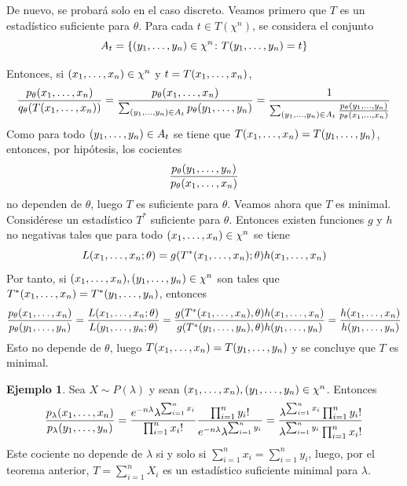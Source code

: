 \documentclass[11pt]{report}
\makeatletter
\renewenvironment{proof}[1][\proofname]{\par
  \pushQED{\qed}%
  \normalfont \topsep\z@skip %
  \trivlist
  \item[\hskip\labelsep
        \itshape
    #1\@addpunct{.}]\ignorespaces
}{%
  \popQED\endtrivlist\@endpefalse
}
\theoremstyle{definition}
\newtheorem{example}{Ejemplo}
\makeatother
\begin{document}
\begin{proof}
De nuevo, se probará solo en el caso discreto. Veamos primero que $T$ es un estadístico suficiente para $\theta$. Para cada $t \in T(\chi^n)$, se considera el conjunto \[A_t = \left\{(y_1,\mathellipsis,y_n) \in \chi^n \colon T(y_1,\mathellipsis,y_n) =t\right\}\] 

Entonces, si $(x_1,\mathellipsis,x_n) \in \chi^n$ y $t = T(x_1,\mathellipsis,x_n)$,
\[\frac{p_\theta(x_1,\mathellipsis,x_n)}{q_\theta(T(x_1,\mathellipsis,x_n))}= \frac{p_\theta(x_1,\mathellipsis,x_n)}{ \sum_{(y_1,\mathellipsis,y_n) \in A_t}p_\theta(y_1,\mathellipsis,y_n)}=\frac{1}{\sum_{(y_1,\mathellipsis,y_n) \in A_t}\frac{p_\theta(y_1,\mathellipsis,y_n)}{p_\theta(x_1,\mathellipsis,x_n)}}\]
Como para todo $(y_1,\mathellipsis,y_n) \in A_t$ se tiene que $T(x_1,\mathellipsis,x_n) = T(y_1,\mathellipsis,y_n)$, entonces, por hipótesis, los cocientes
\[\frac{p_\theta(y_1,\mathellipsis,y_n)}{p_\theta(x_1,\mathellipsis,x_n)}\]
no dependen de $\theta$, luego $T$ es suficiente para $\theta$. Veamos ahora que $T$ es minimal. Considérese un estadístico $T^*$ suficiente para $\theta$. Entonces existen funciones $g$ y $h$ no negativas tales que para todo $(x_1,\mathellipsis,x_n) \in \chi^n$ se tiene
\[L(x_1,\mathellipsis,x_n;\theta) = g(T^*(x_1,\mathellipsis,x_n);\theta)h(x_1,\mathellipsis,x_n)\]
Por tanto, si $(x_1,\mathellipsis,x_n),(y_1,\mathellipsis,y_n) \in \chi^n$ son tales que $T^*(x_1,\mathellipsis,x_n) = T^*(y_1,\mathellipsis,y_n)$, entonces
\[\frac{p_\theta(x_1,\mathellipsis,x_n)}{p_\theta(y_1,\mathellipsis,y_n)} = \frac{L(x_1,\mathellipsis,x_n;\theta)}{L(y_1,\mathellipsis,y_n;\theta)} = \frac{g(T^*(x_1,\mathellipsis,x_n),\theta)h(x_1,\mathellipsis,x_n)}{g(T^*(y_1,\mathellipsis,y_n),\theta)h(y_1,\mathellipsis,y_n)} = \frac{h(x_1,\mathellipsis,x_n)}{h(y_1,\mathellipsis,y_n)}\]
Esto no depende de $\theta$, luego $T(x_1,\mathellipsis,x_n) = T(y_1,\mathellipsis,y_n)$ y se concluye que $T$ es minimal.
\end{proof}

\begin{example}
Sea $X \sim P(\lambda)$ y sean $(x_1,\mathellipsis,x_n), (y_1,\mathellipsis,y_n) \in \chi^n$. Entonces
\[\frac{p_\lambda(x_1,\mathellipsis,x_n)}{p_\lambda(y_1,\mathellipsis,y_n)} = \frac{e^{-n\lambda}\lambda^{\sum_{i=1}^n x_i}}{\prod_{i=1}^n x_i!}\frac{\prod_{i=1}^n y_i!}{e^{-n\lambda}\lambda^{\sum_{i=1}^n y_i}} = \frac{\lambda^{\sum_{i=1}^n x_i}\prod_{i=1}^n y_i!}{\lambda^{\sum_{i=1}^n y_i}\prod_{i=1}^n x_i!}\]
Este cociente no depende de $\lambda$ si y solo si $\sum_{i=1}^n x_i = \sum_{i=1}^n y_i$, luego, por el teorema anterior,
$T= \sum_{i=1}^n X_i$
es un estadístico suficiente minimal para $\lambda$.
\end{example}
\end{document}
